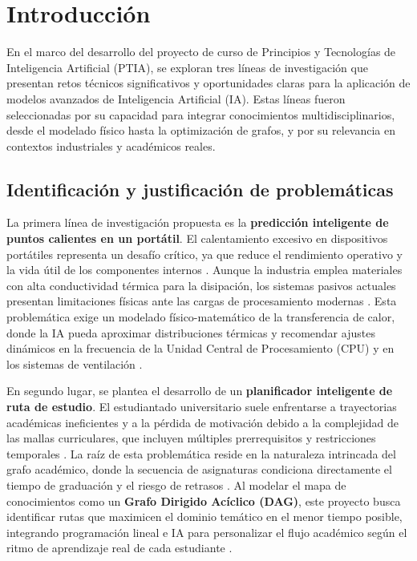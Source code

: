 \section{Introducción}

En el marco del desarrollo del proyecto de curso de Principios y Tecnologías de Inteligencia Artificial (PTIA), se exploran tres líneas de investigación que presentan retos técnicos significativos y oportunidades claras para la aplicación de modelos avanzados de Inteligencia Artificial (IA). Estas líneas fueron seleccionadas por su capacidad para integrar conocimientos multidisciplinarios, desde el modelado físico hasta la optimización de grafos, y por su relevancia en contextos industriales y académicos reales.

\subsection{Identificación y justificación de problemáticas}

La primera línea de investigación propuesta es la \textbf{predicción inteligente de puntos calientes en un portátil}. El calentamiento excesivo en dispositivos portátiles representa un desafío crítico, ya que reduce el rendimiento operativo y la vida útil de los componentes internos \cite{investigacion_termica}. Aunque la industria emplea materiales con alta conductividad térmica para la disipación, los sistemas pasivos actuales presentan limitaciones físicas ante las cargas de procesamiento modernas \cite{investigacion_termica}. Esta problemática exige un modelado físico-matemático de la transferencia de calor, donde la IA pueda aproximar distribuciones térmicas y recomendar ajustes dinámicos en la frecuencia de la Unidad Central de Procesamiento (CPU) y en los sistemas de ventilación \cite{investigacion_termica}.

En segundo lugar, se plantea el desarrollo de un \textbf{planificador inteligente de ruta de estudio}. El estudiantado universitario suele enfrentarse a trayectorias académicas ineficientes y a la pérdida de motivación debido a la complejidad de las mallas curriculares, que incluyen múltiples prerrequisitos y restricciones temporales \cite{sistema_recomendacion_academica}. La raíz de esta problemática reside en la naturaleza intrincada del grafo académico, donde la secuencia de asignaturas condiciona directamente el tiempo de graduación y el riesgo de retrasos \cite{sistema_recomendacion_academica}. Al modelar el mapa de conocimientos como un \textbf{Grafo Dirigido Acíclico (DAG)}, este proyecto busca identificar rutas que maximicen el dominio temático en el menor tiempo posible, integrando programación lineal e IA para personalizar el flujo académico según el ritmo de aprendizaje real de cada estudiante \cite{sistema_recomendacion_academica}.


